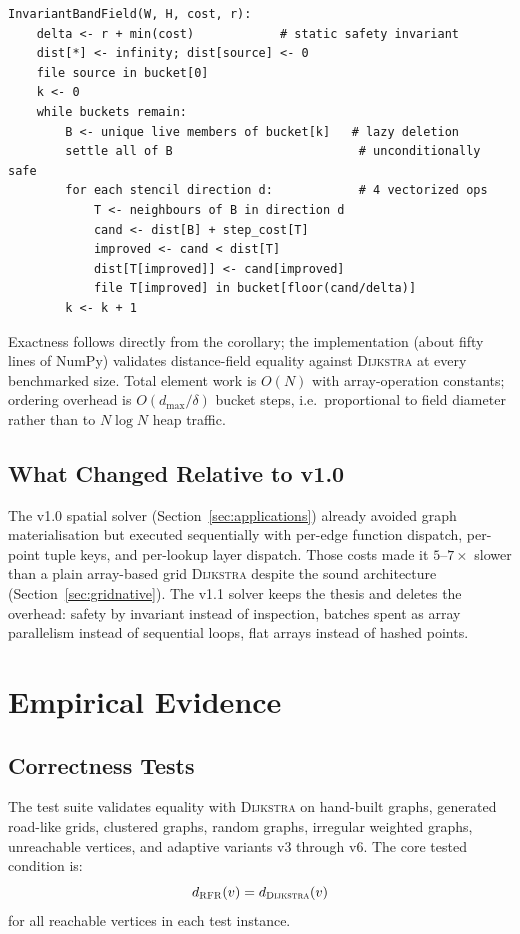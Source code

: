 \documentclass[11pt]{article}
\newcommand{\RFR}{\textsc{RFR}}
\newcommand{\Dijkstra}{\textsc{Dijkstra}}
\begin{document}
\begin{verbatim}
InvariantBandField(W, H, cost, r):
    delta <- r + min(cost)            # static safety invariant
    dist[*] <- infinity; dist[source] <- 0
    file source in bucket[0]
    k <- 0
    while buckets remain:
        B <- unique live members of bucket[k]   # lazy deletion
        settle all of B                          # unconditionally safe
        for each stencil direction d:            # 4 vectorized ops
            T <- neighbours of B in direction d
            cand <- dist[B] + step_cost[T]
            improved <- cand < dist[T]
            dist[T[improved]] <- cand[improved]
            file T[improved] in bucket[floor(cand/delta)]
        k <- k + 1
\end{verbatim}

Exactness follows directly from the corollary; the implementation (about fifty lines of NumPy) validates distance-field equality against \Dijkstra{} at every benchmarked size. Total element work is $O(N)$ with array-operation constants; ordering overhead is $O(d_{\max}/\delta)$ bucket steps, i.e.\ proportional to field diameter rather than to $N\log N$ heap traffic.

\subsection{What Changed Relative to v1.0}

The v1.0 spatial solver (Section~\ref{sec:applications}) already avoided graph materialisation but executed sequentially with per-edge function dispatch, per-point tuple keys, and per-lookup layer dispatch. Those costs made it $5$--$7\times$ slower than a plain array-based grid \Dijkstra{} despite the sound architecture (Section~\ref{sec:gridnative}). The v1.1 solver keeps the thesis and deletes the overhead: safety by invariant instead of inspection, batches spent as array parallelism instead of sequential loops, flat arrays instead of hashed points.

\section{Empirical Evidence}
\label{sec:empirical}

\subsection{Correctness Tests}

The test suite validates equality with \Dijkstra{} on hand-built graphs, generated road-like grids, clustered graphs, random graphs, irregular weighted graphs, unreachable vertices, and adaptive variants v3 through v6. The core tested condition is:
\[
  d_{\RFR}(v)=d_{\Dijkstra}(v)
\]
for all reachable vertices in each test instance.
\end{document}
